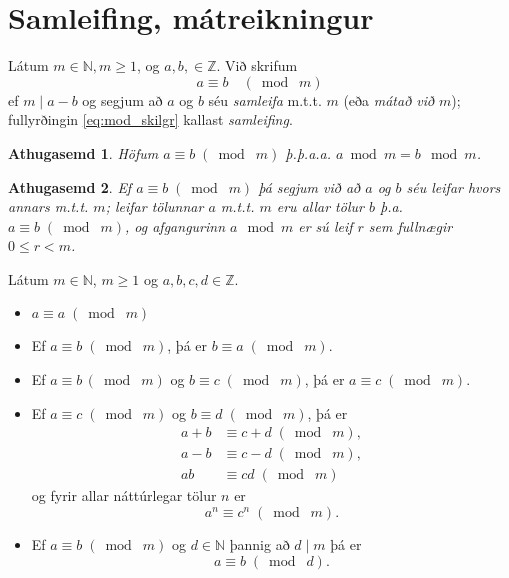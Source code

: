 \documentclass[a4paper,icelandic,11pt]{book}
\theoremstyle{plain}
\newtheorem*{ath}{Athugasemd}
\newcommand{\N}{\mathbb{N}}
\newcommand{\Z}{\mathbb{Z}}
\begin{document}
\section{Samleifing, mátreikningur}
\begin{skilgr}
  Látum $m\in\N,m\ge 1$, og $a,b,\in\Z$. Við skrifum
  \begin{equation}
     a\equiv b \quad (\bmod\;m ) \label{eq:mod_skilgr}
  \end{equation}
  ef $m \mid a-b$ og segjum að $a$ og $b$ séu \emph{samleifa}
  m.t.t. $m$ (eða \emph{mátað við} $m$); fullyrðingin \eqref{eq:mod_skilgr}
  kallast \emph{samleifing}.
\end{skilgr}
\begin{ath}
  Höfum $a\equiv b \; (\bmod\; m)$ þ.þ.a.a. $a\bmod m = b\mod m$.
\end{ath}
\begin{ath}
  Ef $a\equiv b \;(\bmod\; m)$ þá segjum við að $a$ og $b$ séu \emph{leifar}
  hvors annars m.t.t. $m$; \emph{leifar} tölunnar
  $a$ m.t.t. $m$ eru allar tölur $b$ þ.a. $a\equiv b \; (\bmod\; m)$, og
  afgangurinn $a\mod m$ er sú leif $r$ sem fullnægir $0\le r < m$.
\end{ath}
\begin{setn}
  [Reiknireglur]
  Látum $m\in\N$, $m\ge 1$ og $a,b,c,d\in\Z$.
  \begin{itemize}
    \item [(1)] $a\equiv a \; (\bmod \; m)$
    \item [(2)] Ef $a\equiv b \; (\bmod \; m)$, þá er $b\equiv a \; (\bmod \; m)$.
    \item [(3)] Ef $a\equiv b \, (\bmod \; m)$ og $b\equiv c \; (\bmod \; m)$,
      þá er $a\equiv c \; (\bmod \; m)$.
    \item [(4)] Ef $a\equiv c\; (\bmod \; m)$ og $b\equiv d \; (\bmod \; m)$, þá
      er
      \begin{align*}
        a+b &\equiv c+d \; (\bmod \; m), \\
        a-b &\equiv c-d \; (\bmod \; m), \\
        ab & \equiv cd \; (\bmod \; m)
      \end{align*}
      og fyrir allar náttúrlegar tölur $n$ er \[ a^n \equiv c^n \; (\bmod \; m) . \]
    \item [(5)] Ef $a\equiv b \; (\bmod \; m)$ og $d\in\N$ þannig að $d\mid m$ þá er
      \[ a\equiv b \; (\bmod \; d). \]
  \end{itemize}
\end{setn}
\end{document}
